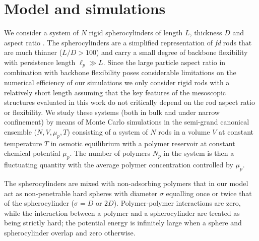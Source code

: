 \section{Model and simulations}

We consider a system of $N$ rigid spherocylinders of length $L$, thickness $D$ and aspect ratio . The spherocylinders are a simplified representation of {\em fd} rods that are much thinner ($L/D > 100$) and carry a small degree of backbone flexibility with persistence length $\ell_{p} \gg L$. Since the large particle aspect ratio in combination with backbone flexibility poses considerable limitations on the numerical efficiency of our simulations  we  only consider rigid rods with a relatively short length assuming that the key features of the mesoscopic structures evaluated in this work do not  critically depend on the rod aspect ratio or flexibility. We study these systems (both in bulk and under narrow confinement) by means of Monte Carlo simulations in the semi-grand canonical ensemble ($N,V,\mu_{p},T$) consisting of a system of $N$ rods in a volume $V$ at constant temperature $T$ in osmotic equilibrium with a polymer reservoir at constant chemical potential $\mu_{p}$. The number of polymers  $N_{p}$ in the system is then a fluctuating quantity with the average polymer concentration controlled by $\mu_{p}$.


The spherocylinders are mixed with non-adsorbing polymers that in our model act as non-penetrable hard spheres with diameter $\sigma$ equalling once or twice that of the spherocylinder ($\sigma = D$ or $2D$). Polymer-polymer interactions are zero, while the interaction between a polymer and a spherocylinder are treated as being strictly hard;  the potential energy is infinitely large when a  sphere and spherocylinder overlap and zero otherwise.



